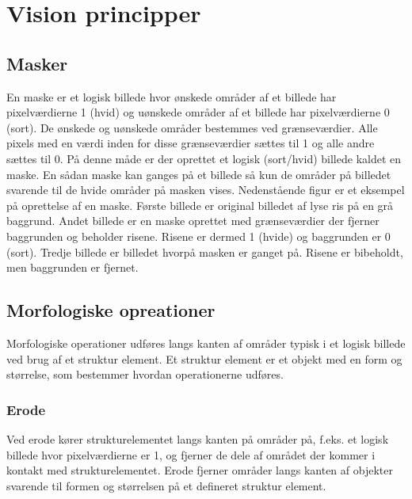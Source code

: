 \chapter{Vision principper}\label{app:VisionPrincipper}

\section{Masker}\label{sec:Masker}
En maske er et logisk billede hvor ønskede områder af et billede har pixelværdierne 1 (hvid) og uønskede områder af et billede har pixelværdierne 0 (sort).
De ønskede og uønskede områder bestemmes ved grænseværdier.
Alle pixels med en værdi inden for disse grænseværdier sættes til 1 og alle andre sættes til 0.
På denne måde er der oprettet et logisk (sort/hvid) billede kaldet en maske.
En sådan maske kan ganges på et billede så kun de områder på billedet svarende til de hvide områder på masken vises.
Nedenstående figur er et eksempel på oprettelse af en maske.
Første billede er original billedet af lyse ris på en grå baggrund.
Andet billede er en maske oprettet med grænseværdier der fjerner baggrunden og beholder risene.
Risene er dermed 1 (hvide) og baggrunden er 0 (sort).
Tredje billede er billedet hvorpå masken er ganget på.
Risene er bibeholdt, men baggrunden er fjernet.

\newpage
\section{Morfologiske opreationer}\label{sec:Morphologi}
Morfologiske operationer udføres langs kanten af områder typisk i et logisk billede ved brug af et struktur element.
Et struktur element er et objekt med en form og størrelse, som bestemmer hvordan operationerne udføres.
\subsection{Erode}
Ved erode kører strukturelementet langs kanten på områder på, f.eks. et logisk billede hvor pixelværdierne er 1, og fjerner de dele af området der kommer i kontakt med strukturelementet.
Erode fjerner områder langs kanten af objekter svarende til formen og størrelsen på et defineret struktur element.


